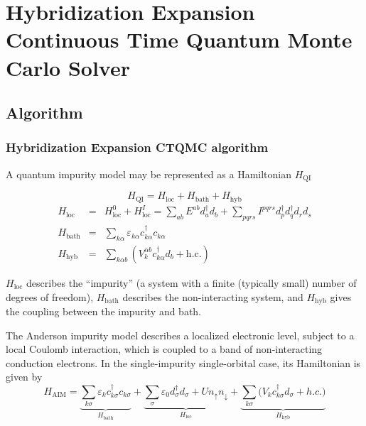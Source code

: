 \chapter{Hybridization Expansion Continuous Time Quantum Monte
Carlo Solver}%

\label{sec:hyb}
\section{Algorithm}
\label{sec:hyb-alg}
\subsection{Hybridization Expansion CTQMC algorithm}
A quantum impurity model may be represented as a Hamiltonian $H_\text{QI}$

\begin{equation}
H_\text{QI}=H_\text{loc}+H_\text{bath}+H_\text{hyb}
\end{equation}
\begin{eqnarray}
H_\text{loc}&=& H_\text{loc}^0+H_\text{loc}^I=
                \sum_{ab} E^{ab}d^\dagger_a d_b + 
                \sum_{pqrs}I^{pqrs}d^\dagger_p d^\dagger_q d_r d_s \\
H_\text{bath}&=&\sum_{k\alpha} 
                 \varepsilon_{k\alpha}c^\dagger_{k\alpha}c_{k\alpha} \\
H_\text{hyb}&=&\sum_{k\alpha b} ({V}_k^{\alpha b}c^\dagger_{k\alpha}d_b 
                +\text{h.c.})
\end{eqnarray}

$H_\text{loc}$ describes the ``impurity'' (a system
with a finite (typically small) number of degrees of freedom), 
$H_\text{bath}$ describes the non-interacting system, 
and $H_\text{hyb}$ gives the coupling between the impurity and bath.

The Anderson impurity model describes a localized electronic level, subject to 
a local Coulomb interaction, which is coupled to a band of non-interacting 
conduction electrons. In the  single-impurity single-orbital case, its 
Hamiltonian is given by
\begin{equation}
H_\text{AIM}= \underbrace{\sum_{k\sigma}
  \varepsilon_k c^\dagger_{k\sigma}c_{k\sigma}}_{H_\text{bath}} 
+  \underbrace{\sum_\sigma \varepsilon_0d^\dagger_\sigma d_\sigma 
  + Un_\uparrow n_\downarrow}_{H_\text{loc}}
+ \underbrace{\sum_{k\sigma}\Big(V_kc^\dagger_{k\sigma}d_\sigma+h.c.\Big)}
_{H_\text{hyb}}
\end{equation}


